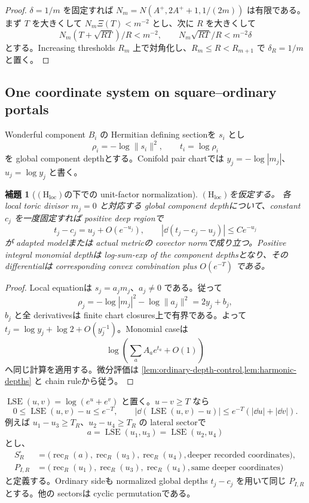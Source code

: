 \documentclass[11pt,a4paper]{ltjsarticle}
\newcommand{\Hloc}{\ensuremath{(\mathrm H_{\mathrm{loc}})}}
\theoremstyle{plain}
\newtheorem{lemma}[theorem]{補題}\newtheorem{corollary}[theorem]{系}
\theoremstyle{definition}
\theoremstyle{remark}
\begin{document}
\begin{proof}
$\delta=1/m$ を固定すれば $N_m=N(A^+,2A^++1,1/(2m))$ は有限である。まず $T$ を大きくして $N_m\Xi(T)<m^{-2}$ とし、次に $R$ を大きくして
\[
 N_m(T+\sqrt{RT})/R<m^{-2},
 \qquad
 N_m\sqrt{RT}/R<m^{-2}\delta
\]
とする。Increasing thresholds $R_m$ 上で対角化し、$R_m\le R<R_{m+1}$ で $\delta_R=1/m$ と置く。
\end{proof}

\subsection{One coordinate system on square--ordinary portals}
Wonderful component $B_i$ の Hermitian defining sectionを $s_i$ とし
\[
 \rho_i=-\log\|s_i\|^2,\qquad t_i=\log\rho_i
\]
を global component depthとする。Conifold pair chartでは $y_j=-\log|m_j|$、$u_j=\log y_j$ と書く。

\begin{lemma}[\Hloc の下での unit-factor normalization]\label{lem:unit-depth-normalization}
\Hloc を仮定する。
各 local toric divisor $m_j=0$ と対応する global component depthについて、constant $c_j$ を一度固定すれば positive deep regionで
\[
 t_j-c_j=u_j+O(e^{-u_j}),\qquad
 |\dd(t_j-c_j-u_j)|\le Ce^{-u_j}
\]
が adapted modelまたは actual metricの covector normで成り立つ。Positive integral monomial depthは log-sum-exp of the component depthsとなり、その differentialは corresponding convex combination plus $O(e^{-T})$ である。
\end{lemma}

\begin{proof}
Local equationは $s_j=a_jm_j$、$a_j\ne0$ である。従って
\[
 \rho_j=-\log|m_j|^2-\log\|a_j\|^2=2y_j+b_j,
\]
$b_j$ と全 derivativesは finite chart closures上で有界である。よって $t_j=\log y_j+\log2+O(y_j^{-1})$。Monomial caseは
\[
 \log\!\left(\sum_a A_a e^{t_a}+O(1)\right)
\]
へ同じ計算を適用する。微分評価は \cref{lem:ordinary-depth-control,lem:harmonic-depths} と chain ruleから従う。
\end{proof}

$\operatorname{LSE}(u,v)=\log(e^u+e^v)$ と置く。$u-v\ge T$ なら
\begin{equation}\label{eq:lse-direct}
 0\le\operatorname{LSE}(u,v)-u\le e^{-T},\qquad
 |\dd(\operatorname{LSE}(u,v)-u)|\le e^{-T}(|\dd u|+|\dd v|).
\end{equation}
例えば $u_1-u_3\ge T_R$、$u_2-u_4\ge T_R$ の lateral sectorで
\[
 a=\operatorname{LSE}(u_1,u_3)=\operatorname{LSE}(u_2,u_4)
\]
とし、
\begin{align*}
 S^{\square}_{R}
 &=\bigl(\operatorname{rec}_R(a),\operatorname{rec}_R(u_3),
       \operatorname{rec}_R(u_4),\text{deeper recorded coordinates}\bigr),\\
 P_{I,R}
 &=\bigl(\operatorname{rec}_R(u_1),\operatorname{rec}_R(u_3),
       \operatorname{rec}_R(u_4),\text{same deeper coordinates}\bigr)
\end{align*}
と定義する。Ordinary sideも normalized global depths $t_j-c_j$ を用いて同じ $P_{I,R}$ とする。他の sectorsは cyclic permutationである。
\end{document}
